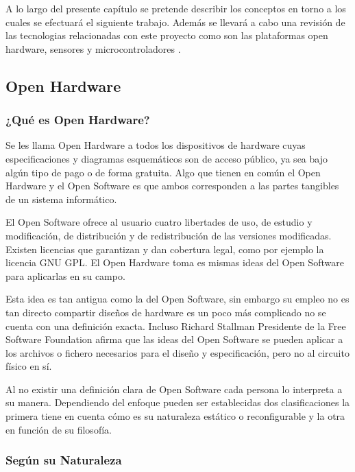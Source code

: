 
A lo largo del presente capítulo se pretende describir los conceptos en torno a los cuales se efectuará el siguiente trabajo. Además se llevará a cabo una revisión de las  tecnologias relacionadas con este proyecto como  son las  plataformas open hardware, sensores y microcontroladores .

\subsection{Open Hardware}
\subsubsection{¿Qué es Open Hardware?}
Se les llama Open Hardware a todos los dispositivos de hardware cuyas especificaciones y diagramas esquemáticos son de acceso público, ya sea bajo algún tipo de pago o de forma gratuita. Algo que tienen en común el Open Hardware y el Open Software es que ambos corresponden a las partes tangibles de un sistema informático.

El Open Software ofrece al usuario cuatro libertades de uso, de estudio  y modificación, de  distribución y de redistribución de las versiones modificadas. Existen licencias que  garantizan y dan cobertura legal,  como  por  ejemplo  la  licencia  GNU GPL. El Open Hardware toma es mismas ideas del Open Software para aplicarlas en su campo.\cite{Osh14}

Esta idea es tan antigua  como la  del Open Software, sin embargo  su  empleo no es tan directo compartir  diseños  de  hardware  es  un poco  más  complicado no se cuenta  con una definición exacta. Incluso Richard Stallman Presidente de la  Free Software Foundation afirma  que  las  ideas del Open Software  se  pueden  aplicar  a los archivos  o fichero necesarios  para el diseño y especificación, pero no  al circuito físico  en  sí.  

Al no existir una  definición clara de Open Software cada persona  lo  interpreta  a su manera. Dependiendo  del  enfoque  pueden  ser  establecidas dos clasificaciones  la primera  tiene en cuenta  cómo es  su naturaleza estático o  reconfigurable  y la  otra   en función  de  su filosofía.

\subsubsection*{Según su Naturaleza}

